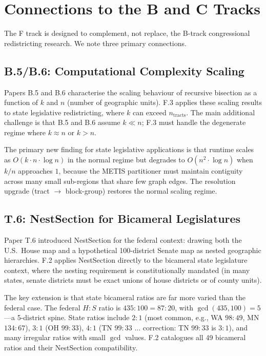 \section{Connections to the B and C Tracks}
\label{sec:connections}

The F track is designed to complement, not replace, the B-track congressional
redistricting research. We note three primary connections.

\subsection{B.5/B.6: Computational Complexity Scaling}
\label{sec:connections:b5b6}

Papers B.5 \citep{dellaLibera2026nwayRecursive} and B.6
\citep{dellaLibera2026complexity} characterise the scaling behaviour of
recursive bisection as a function of $k$ and $n$ (number of geographic units).
F.3 applies these scaling results to state legislative redistricting, where
$k$ can exceed $n_{\mathrm{tracts}}$. The main additional challenge is that
B.5 and B.6 assume $k \ll n$; F.3 must handle the degenerate regime where
$k \approx n$ or $k > n$.

The primary new finding for state legislative applications is that runtime
scales as $O(k \cdot n \cdot \log n)$ in the normal regime but degrades
to $O(n^2 \cdot \log n)$ when $k/n$ approaches $1$, because the METIS
partitioner must maintain contiguity across many small sub-regions that share
few graph edges. The resolution upgrade (tract $\to$ block-group) restores
the normal scaling regime.

\subsection{T.6: NestSection for Bicameral Legislatures}
\label{sec:connections:b13}

Paper T.6 \citep{dellaLibera2026nestSection} introduced NestSection for the
federal context: drawing both the U.S.\ House map and a hypothetical 100-district
Senate map as nested geographic hierarchies. F.2 applies NestSection directly
to the bicameral state legislature context, where the nesting requirement is
constitutionally mandated (in many states, senate districts must be exact unions
of house districts or of county units).

The key extension is that state bicameral ratios are far more varied than the
federal case. The federal $H:S$ ratio is $435:100 = 87:20$, with
$\gcd(435,100) = 5$---a 5-district spine. State ratios include $2:1$ (most
common, e.g., WA $98:49$, MN $134:67$), $3:1$ (OH $99:33$), $4:1$ (TN $99:33$
... correction: TN $99:33$ is $3:1$), and many irregular ratios with small
$\gcd$ values. F.2 catalogues all 49 bicameral ratios and their NestSection
compatibility.

